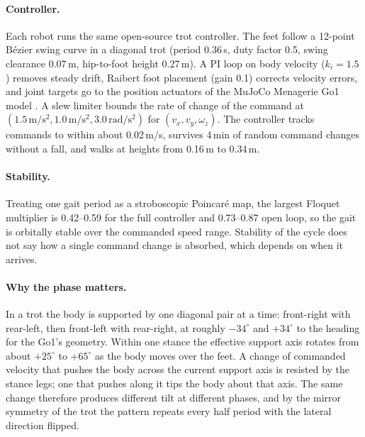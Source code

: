 \paragraph{Controller.} Each robot runs the same open-source trot controller. The feet follow a 12-point
B\'ezier swing curve \cite{hyun2014cheetah,rahme2020spotmini} in a diagonal trot (period 0.36\,s, duty factor
0.5, swing clearance 0.07\,m, hip-to-foot height 0.27\,m). A PI loop on body velocity ($k_i = 1.5$) removes
steady drift, Raibert foot placement \cite{raibert1986legged} (gain 0.1) corrects velocity errors, and joint
targets go to the position actuators of the MuJoCo Menagerie Go1 model
\cite{todorov2012mujoco,zakka2022menagerie}. A slew limiter bounds the rate of change of the command at
$(1.5\,\mathrm{m/s^2}, 1.0\,\mathrm{m/s^2}, 3.0\,\mathrm{rad/s^2})$ for $(v_x, v_y, \omega_z)$. The
controller tracks commands to within about 0.02\,m/s, survives 4\,min of random command changes without a
fall, and walks at heights from 0.16\,m to 0.34\,m.

\paragraph{Stability.} Treating one gait period as a stroboscopic Poincar\'e map, the largest Floquet
multiplier is 0.42--0.59 for the full controller and 0.73--0.87 open loop, so the gait is orbitally stable
over the commanded speed range. Stability of the cycle does not say how a single command change is
absorbed, which depends on when it arrives.

\paragraph{Why the phase matters.} In a trot the body is supported by one diagonal pair at a time: front-right
with rear-left, then front-left with rear-right, at roughly $-34^\circ$ and $+34^\circ$ to the heading for the
Go1's geometry. Within one stance the effective support axis rotates from about $+25^\circ$ to $+65^\circ$ as
the body moves over the feet. A change of commanded velocity that pushes the body across the current support
axis is resisted by the stance legs; one that pushes along it tips the body about that axis. The same change
therefore produces different tilt at different phases, and by the mirror symmetry of the trot the pattern
repeats every half period with the lateral direction flipped.

